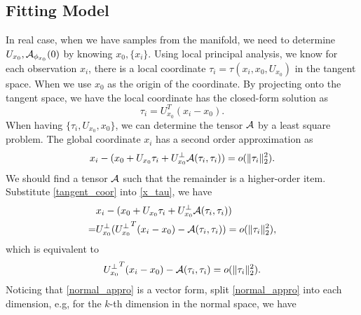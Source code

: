 \documentclass{article}
\theoremstyle{remark}
\begin{document}
\subsection{Fitting Model}
In real case, when we have samples from the manifold, we need to determine  $U_{x_0}, {\cal A}_{\phi_{x_0}}(0)$ by knowing $x_0, \{x_i\}$.
Using local principal analysis, we know for each observation $x_i$, there is a local coordinate $\tau_i = \tau(x_i,x_0, U_{x_0})$ in the tangent space. When we use $x_0$ as the origin of the coordinate. By projecting onto the tangent space, we have the local coordinate has the closed-form solution as
\begin{equation}\label{tangent_coor}
\tau_i = U_{x_0}^T (x_i -x_0).
\end{equation}
When having $\{\tau_i, U_{x_0}, x_0\}$, we can determine the tensor $\cal A$ by a least square problem. The global coordinate $x_i$ has a second order approximation as
\begin{equation}\label{x_tau}
 x_i  -  (x_0+ U_{x_0} \tau_i + U_{x_0}^{\perp} {\cal A}(\tau_i,\tau_i)) = o(\|\tau_i\|_2^2).
\end{equation}
We should find a tensor $\cal A$ such that the remainder is a higher-order item.
Substitute \eqref{tangent_coor} into \eqref{x_tau}, we have
\[
\begin{aligned}
 &x_i  -  (x_0+ U_{x_0} \tau_i + U_{x_0}^{\perp} {\cal A}(\tau_i,\tau_i))\\
 =&U_{x_0}^\perp( {U_{x_0}^\perp}^T (x_i -x_0) -{\cal A}(\tau_i,\tau_i) )= o(\|\tau_i\|_2^2),
 \end{aligned}
\]
which is equivalent to 
\begin{equation}\label{normal_appro}
 {U_{x_0}^\perp}^T (x_i -x_0) -{\cal A}(\tau_i,\tau_i) = o(\|\tau_i\|_2^2).
\end{equation}
Noticing that \eqref{normal_appro} is a vector form, split \eqref{normal_appro} into each dimension, e.g, for the $k$-th dimension in the normal space, we have
\end{document}
